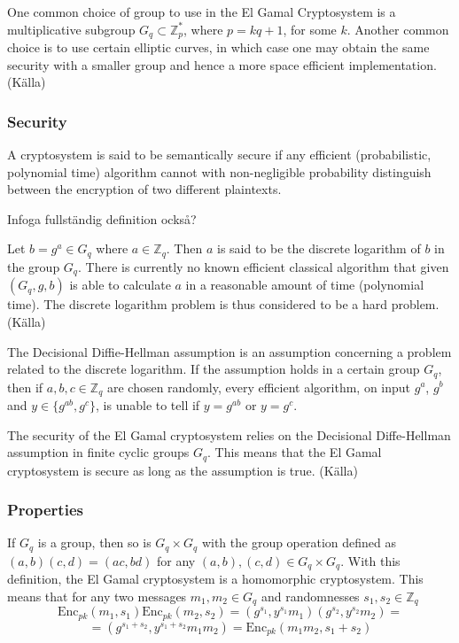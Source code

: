 One common choice of group to use in the El Gamal Cryptosystem is a
multiplicative subgroup $G_q \subset \mathbb{Z}_p^*$, where $p = kq +
1$, for some $k$. Another common choice is to use certain elliptic
curves, in which case one may obtain the same security with a smaller
group and hence a more space efficient implementation. (Källa)

\subsubsection{Security}
A cryptosystem is said to be semantically secure if any efficient
(probabilistic, polynomial time) algorithm cannot with non-negligible
probability distinguish between the encryption of two different
plaintexts.

Infoga fullständig definition också?

Let $b = g^a \in G_q$ where $a \in \mathbb{Z}_q$. Then $a$ is said to
be the discrete logarithm of $b$ in the group $G_q$. There is
currently no known efficient classical algorithm that given $(G_q, g,
b)$ is able to calculate $a$ in a reasonable amount of time
(polynomial time). The discrete logarithm problem is thus considered
to be a hard problem. (Källa)

The Decisional Diffie-Hellman assumption is an assumption concerning a
problem related to the discrete logarithm. If the assumption holds in
a certain group $G_q$, then if $a,b,c \in \mathbb{Z}_q$ are chosen
randomly, every efficient algorithm, on input $g^a$, $g^b$ and $y \in
\{g^{ab}, g^c\}$, is unable to tell if $y = g^{ab}$ or $y = g^c$.

The security of the El Gamal cryptosystem relies on the Decisional
Diffe-Hellman assumption in finite cyclic groups $G_q$. This means
that the El Gamal cryptosystem is secure as long as the assumption is
true. (Källa)

\subsubsection{Properties}
If $G_q$ is a group, then so is $G_q \times G_q$ with the group
operation defined as $(a,b)(c,d) = (a c, b d)$
for any $(a,b),(c,d) \in G_q \times G_q$. With this definition, the El Gamal
cryptosystem is a homomorphic cryptosystem. This means that for any
two messages $m_1, m_2 \in G_q$ and randomnesses $s_1, s_2 \in
\mathbb{Z}_q$
$$
 \mathrm{Enc}_{pk}(m_1, s_1)\mathrm{Enc}_{pk}(m_2, s_2) =
(g^{s_1}, y^{s_1}m_1)(g^{s_2},y^{s_2}m_2) =
$$
$$
= (g^{s_1 + s_2}, y^{s_1 + s_2}m_1m_2) = \mathrm{Enc}_{pk}(m_1m_2, s_1 + s_2)
$$

